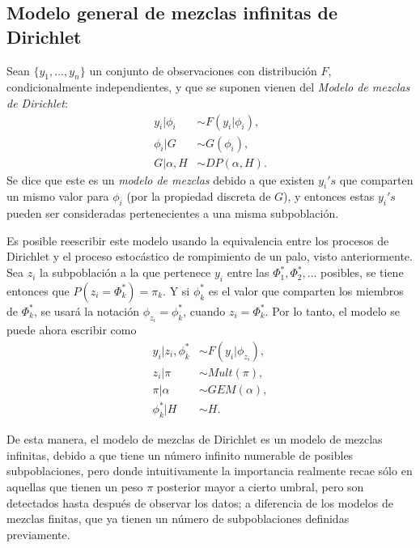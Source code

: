 \subsection{Modelo general de mezclas infinitas de Dirichlet}

Sean $\{y_1,...,y_n\}$ un conjunto de observaciones con distribuci\'on $F$, condicionalmente independientes, y que se suponen vienen del \textit{Modelo de mezclas de Dirichlet}:
\begin{equation*}
\begin{aligned}
   y_i | \phi_i &\sim F(y_i | \phi_i), \\
   \phi_i | G &\sim G(\phi_i), \\
   G | \alpha, H &\sim DP(\alpha,H).
\end{aligned}
\end{equation*}
Se dice que este es un \textit{modelo de mezclas} debido a que existen $y_i's$ que comparten un mismo valor para $\phi_i$ (por la propiedad discreta de $G$), y entonces estas $y_i's$ pueden ser consideradas pertenecientes a una misma subpoblaci\'on.

Es posible reescribir este modelo usando la equivalencia entre los procesos de Dirichlet y el proceso estoc\'astico de rompimiento de un palo, visto anteriormente. Sea $z_i$ la subpoblaci\'on a la que pertenece $y_i$ entre las $\Phi_1^*,\Phi_2^*,...$ posibles, se tiene entonces que $P(z_i = \Phi_k^*) = \pi_k$. Y si $\phi_k^*$ es el valor que comparten los miembros de $\Phi_k^*$, se usar\'a la notaci\'on $\phi_{z_i} = \phi_k^*$, cuando $z_i = \Phi_k^*$. Por lo tanto, el modelo se puede ahora escribir como
\begin{equation*}
\begin{aligned}
   y_i | z_i, \phi_k^* &\sim F(y_i | \phi_{z_i}), \\
   z_i | \pi &\sim Mult(\pi), \\
   \pi | \alpha &\sim GEM(\alpha), \\
   \phi_k^* | H &\sim H.
\end{aligned}
\end{equation*}

De esta manera, el modelo de mezclas de Dirichlet es un modelo de mezclas infinitas, debido a que tiene un n\'umero infinito numerable de posibles subpoblaciones, pero donde intuitivamente la importancia realmente recae s\'olo en aquellas que tienen un peso $\pi$ posterior mayor a cierto umbral, pero son detectados hasta despu\'es de observar los datos; a diferencia de los modelos de mezclas finitas, que ya tienen un n\'umero de subpoblaciones definidas previamente.

